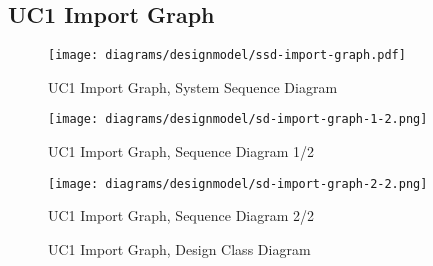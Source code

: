 \subsection{UC1 Import Graph}
\begin{figure}[H]
    \centering
    \texttt{[image: diagrams/designmodel/ssd-import-graph.pdf]}
    \caption{UC1 Import Graph, System Sequence Diagram}
    \label{fig:import-graph-ssd}
\end{figure}
\begin{figure}[p]%
  \begin{leftfullpage}
    \texttt{[image: diagrams/designmodel/sd-import-graph-1-2.png]}
    \caption{UC1 Import Graph, Sequence Diagram 1/2}
    \label{fig:import-graph-sd-1}
  \end{leftfullpage}
\end{figure}
\begin{figure}[p]%
  \begin{fullpage}
    \texttt{[image: diagrams/designmodel/sd-import-graph-2-2.png]}
    \caption{UC1 Import Graph, Sequence Diagram 2/2}
    \label{fig:import-graph-sd-2}
  \end{fullpage}
\end{figure}
\begin{figure}[H]
    \centering
    \caption{UC1 Import Graph, Design Class Diagram}
    \label{fig:import-graph-dcd}
\end{figure}
\newpage
% 
